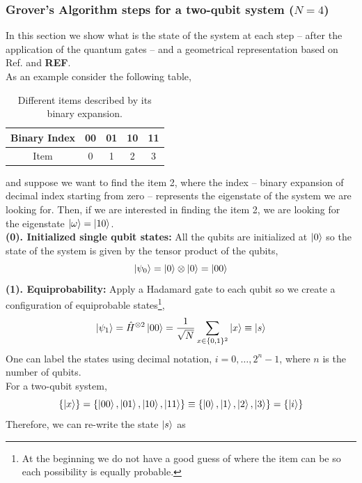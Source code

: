 \subsubsection{Grover's Algorithm steps for a two-qubit system ($N=4$)}
In this section we show what is the state of the system at each step -- after the application of the quantum gates -- and a geometrical representation based on Ref. \cite{Lavor2008Search} and \textbf{REF}.\\
As  an example consider the following table,
\begin{table}
\label{tab:GroverSearch}
\centering
\begin{tabular}{ c | c | c | c | c }
  \hline			
  Binary Index & 00 & 01 & 10 & 11 \\
    \hline		
  Item & 0 & 1 & 2 & 3 \\
  \hline  
\end{tabular}
\caption{Different items described by its binary expansion.}
\end{table}
and suppose we want to find the item 2, where the index -- binary expansion of decimal index starting from zero -- represents the eigenstate of the system we are looking for. Then, if we are interested in finding the item 2, we are looking for the eigenstate $\ket{\omega} = \ket{10}$.\\
\textbf{(0). Initialized single qubit states:} All the qubits are initialized at $\ket{0}$ so the state of the system is given by the tensor product of the qubits,
\begin{equation}
    \ket{\psi_{0}} = \ket{0}\otimes \ket{0} = \ket{00}
\end{equation}
\textbf{(1). Equiprobability:} Apply a Hadamard gate to each qubit so we create a configuration of equiprobable states\footnote{At the beginning we do not have a good guess of where the item can be so each possibility is equally probable.},
\begin{equation}
    \ket{\psi_{1}} = \hat{H}^{\otimes 2}\ket{00} = \frac{1}{\sqrt{N}}\sum_{x \in \{0,1\}^{2}}\ket{x} \equiv \ket{s}
\end{equation}
 One can label the states using decimal notation, $i = 0 ,\ldots, 2^{n} -1$, where $n$ is the number of qubits.\\
For a two-qubit system,
\begin{equation}
   \{\ket{x}\} = \{\ket{00},\ket{01},\ket{10},\ket{11}\} \equiv \{\ket{0},\ket{1},\ket{2},\ket{3}\} = \{\ket{i}\}
\end{equation}
Therefore, we can re-write the state $\ket{s}$ as
